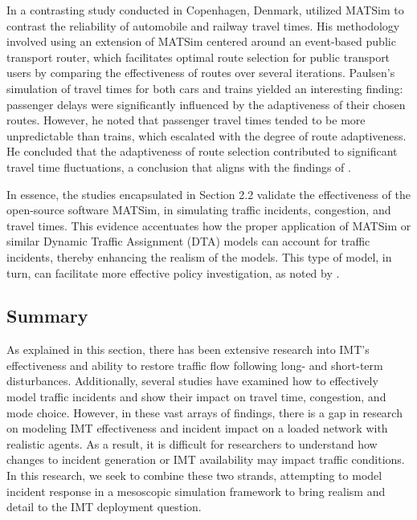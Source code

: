 \documentclass[
  letterpaper,
  authoryear]{elsarticle}
\begin{document}
In a contrasting study conducted in Copenhagen, Denmark,
\citet{paulsen2018} utilized MATSim to contrast the reliability of
automobile and railway travel times. His methodology involved using an
extension of MATSim centered around an event-based public transport
router, which facilitates optimal route selection for public transport
users by comparing the effectiveness of routes over several iterations.
Paulsen's simulation of travel times for both cars and trains yielded an
interesting finding: passenger delays were significantly influenced by
the adaptiveness of their chosen routes. However, he noted that
passenger travel times tended to be more unpredictable than trains,
which escalated with the degree of route adaptiveness. He concluded that
the adaptiveness of route selection contributed to significant travel
time fluctuations, a conclusion that aligns with the findings of
\citet{li2020}.

In essence, the studies encapsulated in Section 2.2 validate the
effectiveness of the open-source software MATSim, in simulating traffic
incidents, congestion, and travel times. This evidence accentuates how
the proper application of MATSim or similar Dynamic Traffic Assignment
(DTA) models can account for traffic incidents, thereby enhancing the
realism of the models. This type of model, in turn, can facilitate more
effective policy investigation, as noted by \citet{kaddoura2018}.

\hypertarget{summary}{%
\subsection{Summary}\label{summary}}

As explained in this section, there has been extensive research into
IMT's effectiveness and ability to restore traffic flow following long-
and short-term disturbances. Additionally, several studies have examined
how to effectively model traffic incidents and show their impact on
travel time, congestion, and mode choice. However, in these vast arrays
of findings, there is a gap in research on modeling IMT effectiveness
and incident impact on a loaded network with realistic agents. As a
result, it is difficult for researchers to understand how changes to
incident generation or IMT availability may impact traffic conditions.
In this research, we seek to combine these two strands, attempting to
model incident response in a mesoscopic simulation framework to bring
realism and detail to the IMT deployment question.
\end{document}

